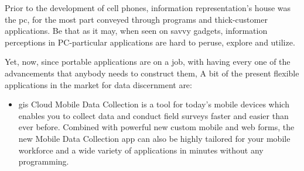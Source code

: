 Prior to the development of cell phones, information representation's house was the \gls{pc}, for the most part conveyed through programs and thick-customer applications. Be that as it may, when seen on savvy gadgets, information perceptions in PC-particular applications are hard to peruse, explore and utilize.

Yet, now, since portable applications are on a job, with having every one of the advancements that anybody needs to construct them, A bit of the present flexible applications in the market for data discernment are:

\begin{itemize}
  \item \gls{gis} Cloud Mobile Data Collection is a tool for today’s mobile devices which enables you to collect data and conduct field surveys faster and easier than ever before. Combined with powerful new custom mobile and web forms, the new Mobile Data Collection app can also be highly tailored for your mobile workforce and a wide variety of applications in minutes without any programming. \cite{GIS_cloud_mobile_data_collection}
  
  
  

\end{itemize}
